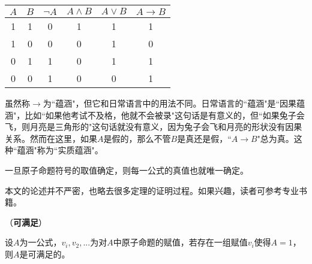 \begin{table}[!htb]
\centering
\caption{}
\label{my-label}
\begin{tabular}{cc|cccc}
\multicolumn{1}{l}{$A$} & \multicolumn{1}{l|}{$B$} & \multicolumn{1}{l}{$\neg A$} & \multicolumn{1}{l}{$A \land B$} & \multicolumn{1}{l}{$A \lor B$} & \multicolumn{1}{l}{$A \to B$} \\ \hline
1                       & 1                        & 0                            & 1                                & 1                              & 1                             \\
1                       & 0                        & 0                            & 0                                & 1                              & 0                             \\
0                       & 1                        & 1                            & 0                                & 1                              & 1                             \\
0                       & 0                        & 1                            & 0                                & 0                              & 1
\end{tabular}
\end{table}

\begin{rem}
虽然称$\to$为``蕴涵"，但它和日常语言中的用法不同。日常语言的``蕴涵"是``因果蕴涵"，比如``如果他考试不及格，他就不会被录"这句话是有意义的，但``如果兔子会飞，则月亮是三角形的"这句话就没有意义，因为兔子会飞和月亮的形状没有因果关系。然而在这里，如果$A$是假的，那么不管$B$是真还是假，``$A \to B$"总为真。这种``蕴涵"称为``实质蕴涵"。


\end{rem}


\begin{thm}
一旦原子命题符号的取值确定，则每一公式的真值也就唯一确定。
\end{thm}

\begin{rem}
本文的论述并不严密，也略去很多定理的证明过程。如果兴趣，读者可参考专业书籍。
\end{rem}

\begin{defn}（\textbf{可满足}）

设$A$为一公式，$v_i, v_2, ...$为对$A$中原子命题的赋值，若存在一组赋值$v_i$使得$A = 1$，则$A$是可满足的。

\end{defn}


